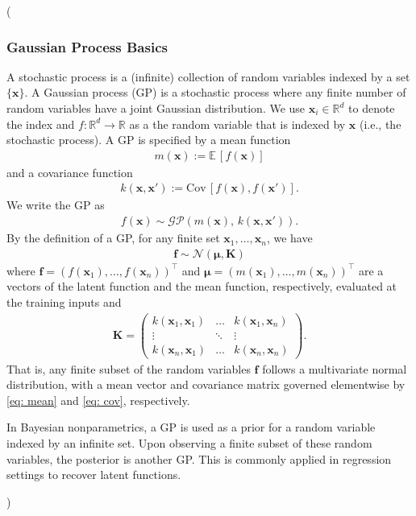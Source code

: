 \documentclass[journal=jacsat,manuscript=article]{achemso}
\newcommand{\kjnote}[1]{{\color{blue} (#1)}}
\newcommand{\reals}{\ensuremath{\mathbb{R}}}
\newcommand{\xvec}{\ensuremath{\mathbf{x}}}
\begin{document}
\kjnote{
\subsubsection{Gaussian Process Basics}
A stochastic process is a (infinite) collection of random variables indexed by a set $\{\xvec\}$. A Gaussian process (GP) is a stochastic process where any finite number of random variables have a joint Gaussian distribution. We use $\xvec_i \in \reals^d$ to denote the index and $f: \reals^d \rightarrow \reals$ as a the random variable that is indexed by $\xvec$ (i.e., the stochastic process). A GP is specified by a mean function
\begin{gather}
    m(\xvec) := \mathbb{E}\,[f(\xvec)] \label{eq: mean}
\end{gather}
and a covariance function
\begin{gather}
    k(\xvec, \xvec') := \text{Cov}\,[f(\xvec), f(\mathbf{x'})]. \label{eq: cov}
\end{gather}
We write the GP as
\begin{gather}
    f(\xvec)\sim \mathcal{GP}(m(\xvec), \, k(\xvec,\xvec')).
\end{gather}
By the definition of a GP, for any finite set $\xvec_1, \dots, \xvec_n$, we have
\begin{gather}
     \mathbf{f} \sim \mathcal{N}(\boldsymbol{\mu}, \mathbf{K})
\end{gather}
where $\mathbf{f}=(f(\xvec_1),  \dots, f(\xvec_n))^\intercal$ and $\boldsymbol{\mu} = (m(\xvec_1),  \dots, m(\xvec_n))^\intercal$ are a vectors of the latent function and the mean function, respectively, evaluated at the training inputs and
\begin{gather}
    \mathbf{K} = 
    \left(
    \begin{matrix}
        k(\xvec_1,\xvec_1) & \dots & k(\xvec_1,\xvec_n) \\
        \vdots & \ddots & \vdots \\
        k(\xvec_n,\xvec_1) & \dots & k(\xvec_n,\xvec_n)
    \end{matrix}\right).
\end{gather}
That is, any finite subset of the random variables $\mathbf{f}$ follows a multivariate normal distribution, with a mean vector and covariance matrix governed elementwise by \eqref{eq: mean} and \eqref{eq: cov}, respectively.

In Bayesian nonparametrics, a GP is used as a prior for a random variable indexed by an infinite set. Upon observing a finite subset of these random variables, the posterior is another GP. This is commonly applied in regression settings to recover latent functions.

}
\end{document}
